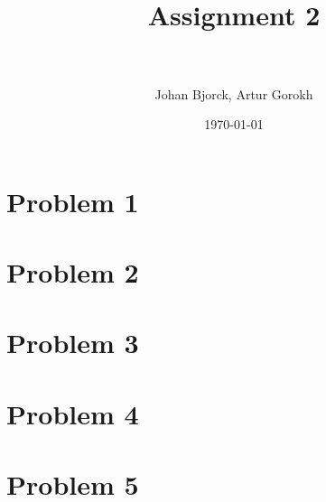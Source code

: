 \documentclass[paper=a4, fontsize=10pt]{scrartcl} %
\title{ 
\normalfont \normalsize
\horrule{0.5pt} \\[0.2cm] %
\huge Assignment 2 \\ %
\horrule{1pt} \\[0.2cm] %
}
\author{Johan Bjorck, Artur Gorokh} %
\date{\normalsize\today} %
\numberwithin{equation}{section} %
\numberwithin{figure}{section} %
\numberwithin{table}{section} %
\begin{document}
\maketitle %

\section*{Problem 1}

\section*{Problem 2}

\section*{Problem 3}

\section*{Problem 4}

\section*{Problem 5}

\end{document}
